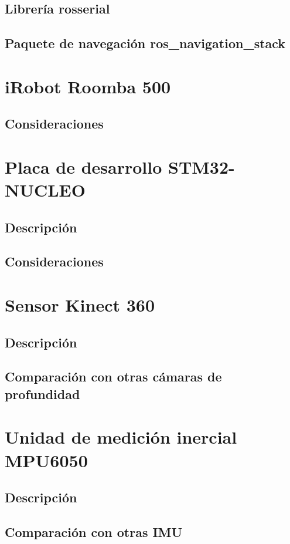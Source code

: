 \subsection{Librería rosserial}
\subsection{Paquete de navegación ros\_navigation\_stack}
\section{iRobot Roomba 500}
\subsection{Consideraciones}
\section{Placa de desarrollo STM32-NUCLEO}
\subsection{Descripción}
\subsection{Consideraciones}
\section{Sensor Kinect 360}
\subsection{Descripción}
\subsection{Comparación con otras cámaras de profundidad}
\section{Unidad de medición inercial MPU6050}
\subsection{Descripción}
\subsection{Comparación con otras IMU}
